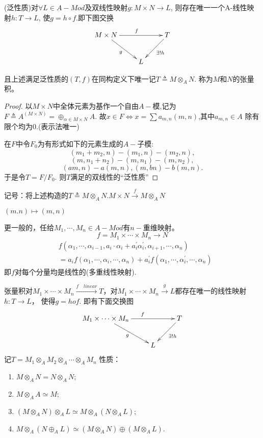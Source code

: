 \documentclass[UTF8]{article}
\begin{document}
(泛性质)对$\forall L \in A-Mod$及双线性映射$g:M \times N \rightarrow L$, 则存在唯一一个A-线性映射$h:T \rightarrow L$, 使$g=h\circ f.$即下图交换
$$
\xymatrix{
	M\times N\ar[rr]^{f}\ar[rd]_{g}& &T\ar[ld]^{\exists! h}\\
	&L&
}
$$


且上述满足泛性质的$(T,f)$在同构定义下唯一记$T \triangleq M \otimes_{A} N$. 称为$M$和$N$的张量积。


\begin{proof}
	
	以$M \times N$中全体元素为基作一个自由$A-$模,记为$F\triangleq A^{(M \times N)}=\oplus_{\alpha\in M\times N}A$. 故$x\in F\Leftrightarrow x=\sum a_{m,n}(m,n)$,其中$a_{m,n}\in A$ 除有限个均为0.(表示法唯一)
	
	在$F$中令$F_0$为有形式如下的元素生成的$A-$子模:
	$$\left(m_{1}+m_{2}, n\right)-\left(m_{1}, n\right)-\left(m_{2}, n\right),$$ 
	$$\left(m, n_{1}+n_{2}\right)-\left(m, n_{1}\right)-\left(m, n_{2}\right),$$
	$$(a m,n)-a(m,n),(m,bn)-b(m,n).$$
	于是令$T=F / F_{0}.$
	则$T$满足的双线性的“泛性质”
\end{proof}
记号：将上述构造的$T \triangleq M \otimes_{A} N .$\qquad$M\times N\xrightarrow{f}M \otimes_{A} N$

\qquad\qquad\qquad\qquad\qquad\qquad\qquad\qquad\qquad$(m.n)\mapsto (m,n)$

更一般的，任给$M_{1}, \cdots, M_{n} \in A-Mod$有$n-$重维映射。
\[
f=M_{1} \times \cdots \times M_{n} \rightarrow N
\]
$$
\begin{aligned}
&f\left(\alpha_{1},\cdots,\alpha_{i-1},a_{i} \cdot \alpha_{i}+a_{i}^{\prime} \alpha_{i}^{\prime},\alpha_{i+1}, \cdots, \alpha_{n}\right)
\\
&=a_{i}f(\alpha_{1}, \cdots ,\alpha_{i}, \cdots, \alpha_{n})+a_{i}^{\prime} f\left(\alpha_{1} ,\cdots, \alpha_{i}^{\prime} ,\cdots ,\alpha_{n}\right)
\end{aligned}$$
即$f$对每个分量均是线性的(多重线性映射).

张量积对$M_{1} \times \cdots \times M_{n} \xrightarrow{f\quad linear}T$，对$M_{1} \times \cdots \times M_{n} \xrightarrow{g}L$都存在唯一的线性映射$h:T\longrightarrow L$，
使得$g=hof$.
即有下面交换图
$$
\xymatrix{
	M_{1} \times \cdots \times M_{n}\ar[rr]^{f}\ar[rd]_{g}& &T\ar[ld]^{\exists!h}\\
	&L&
}
$$
记$T=M_{1} \otimes_A M_{2}\otimes_A \cdots\otimes_A M_{n}$
性质：
\begin{enumerate}
	\item $M \otimes_{A} N=N \otimes_{A} N;$
	\item $M \otimes_{A} A\simeq M;$
	\item $(M \otimes_{A} N)\otimes_{A} L\simeq M \otimes_{A} (N \otimes_{A} L);$
	\item $M \otimes_{A}\left(N \oplus_{A} L\right)\simeq \left(M \otimes_{A} N\right)\oplus(M\otimes_{A} L).$
\end{enumerate}
\end{document}

